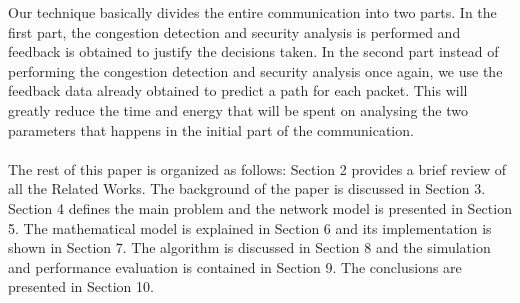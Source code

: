 \documentclass[journal]{IEEEtran}
\begin{document}
\indent Our technique basically divides the entire communication into two parts. In the first part, the congestion detection and security analysis is performed and feedback is obtained to justify the decisions taken. In the second part instead of performing the congestion detection and security analysis once again, we use the feedback data already obtained to predict a path for each packet. This will greatly reduce the time and energy that will be spent on analysing the two parameters that happens in the initial part of the communication. \\ \\
\indent The rest of this paper is organized as follows: Section 2 provides a brief review of all the Related Works. The background of the paper is discussed in Section 3. Section 4 defines the main problem and the network model is presented in Section 5. The mathematical model is explained in Section 6 and its implementation is shown in Section 7. The algorithm is discussed in Section 8 and the simulation and performance evaluation is contained in Section 9. The conclusions are presented in Section 10.

 





%
%
\end{document}
